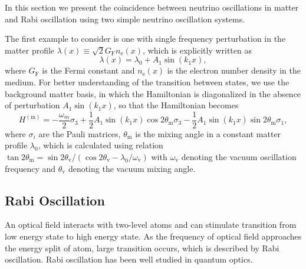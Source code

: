 \documentclass[%
preprint,
 amsmath,amssymb,
 aps,
]{revtex4-1}
\begin{document}


In this section we present the coincidence between neutrino oscillations in matter and Rabi oscillation using two simple neutrino oscillation systems. 

The first example to consider is one with single frequency perturbation in the matter profile $\lambda(x)\equiv\sqrt{2}G_{\mathrm F} n_{\mathrm e}(x)$, which is explicitly written as
\begin{equation}
    \lambda(x) = \lambda_0 + A_1 \sin (k_1 x) ,
    \label{single-frequency-matter-profile}
\end{equation}
where $G_{\mathrm F}$ is the Fermi constant and $n_{\mathrm e}(x)$ is the electron number density in the medium. For better understanding of the transition between states, we use the background matter basis, in which the Hamiltonian is diagonalized in the absence of perturbation $A_1\sin(k_1 x)$, so that the Hamiltonian becomes
\begin{equation}
    H^{(\mathrm{m})} = -\frac{\omega_m}{2} \sigma_3 + \frac{1}{2} A_1 \sin (k_1 x) \cos 2\theta_{\mathrm m} \sigma_3 -\frac{1}{2} A_1  \sin(k_1 x) \sin 2\theta_{\mathrm m} \sigma_1,\label{neutrino-matter-single-frequency-hamiltonian}
\end{equation}
where $\sigma_i$ are the Pauli matrices, $\theta_{\mathrm m}$ is the mixing angle in a constant matter profile $\lambda_0$, which is calculated using relation $\tan 2\theta_{\mathrm{m}}=\sin 2\theta_{\mathrm v}/\left( \cos 2\theta_{\mathrm v} - \lambda_0/\omega_{\mathrm v} \right)$ with $\omega_{\mathrm v}$ denoting the vacuum oscillation frequency and $\theta_{\mathrm v}$ denoting the vacuum mixing angle.





\subsection{Rabi Oscillation}


An optical field interacts with two-level atoms and can stimulate transition from low energy state to high energy state. As the frequency of optical field approaches the energy split of atom, large transition occurs, which is described by Rabi oscillation. Rabi oscillation has been well studied in quantum optics.\cite{Boyd2008} 
\end{document}
